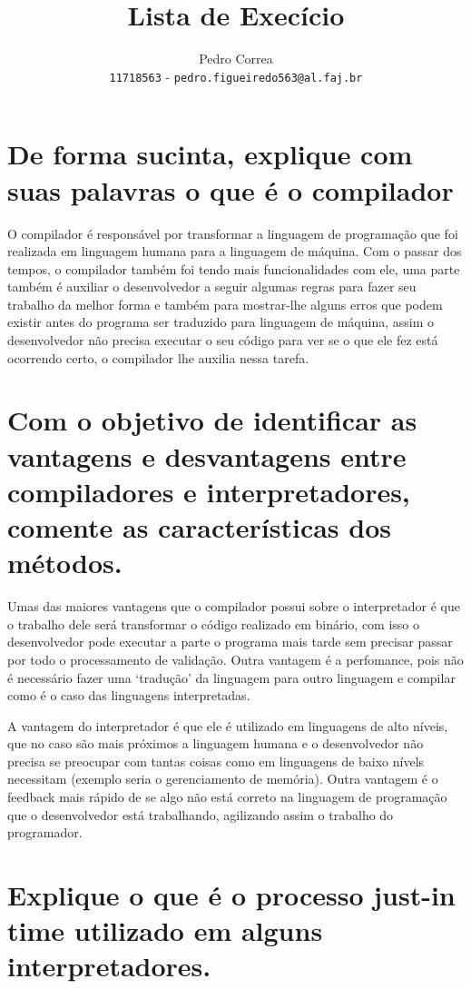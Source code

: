\documentclass{article}
\author{
  Pedro Correa\\
  \texttt{11718563} - \texttt{pedro.figueiredo563@al.faj.br}
}
\title{Lista de Execício}
\begin{document}
\maketitle

\newpage

\section{De forma sucinta, explique com suas palavras o que é o compilador}

O compilador é responsável por transformar a linguagem de programação que foi realizada em linguagem humana para a linguagem de máquina.
Com o passar dos tempos, o compilador também foi tendo mais funcionalidades com ele, uma parte também é auxiliar o desenvolvedor a seguir algumas regras para fazer seu trabalho da melhor forma e também para mostrar-lhe alguns erros que podem existir antes do programa ser traduzido para linguagem de máquina,
assim o desenvolvedor não precisa executar o seu código para ver se o que ele fez está ocorrendo certo, o compilador lhe auxilia nessa tarefa.

\section{Com o objetivo de identificar as vantagens e desvantagens entre compiladores e interpretadores, comente as características dos métodos.}

Umas das maiores vantagens que o compilador possui sobre o interpretador é que o trabalho dele será transformar o código realizado em binário,
com isso o desenvolvedor pode executar a parte o programa mais tarde sem precisar passar por todo o processamento de validação.
Outra vantagem é a perfomance, pois não é necessário fazer uma `tradução' da linguagem para outro linguagem e compilar como é o caso das linguagens interpretadas.

A vantagem do interpretador é que ele é utilizado em linguagens de alto níveis, que no caso são mais próximos a linguagem humana e o desenvolvedor não precisa se preocupar com tantas coisas como em linguagens de baixo nívels necessitam (exemplo seria o gerenciamento de memória).
Outra vantagem é o feedback mais rápido de se algo não está correto na linguagem de programação que o desenvolvedor está trabalhando,
agilizando assim o trabalho do programador.

\section{Explique o que é o processo just-in time utilizado em alguns interpretadores.}
\end{document}
